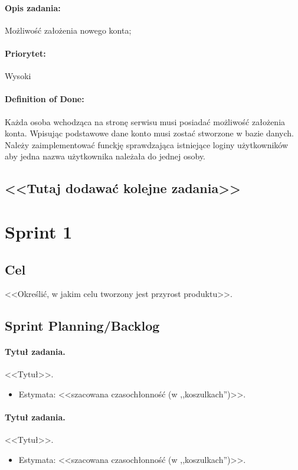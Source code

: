 \documentclass[a4paper]{article}
\begin{document}
	\paragraph{Opis zadania:} Możliwość założenia nowego konta;
	\paragraph{Priorytet:} Wysoki
	\paragraph{Definition of Done:} Każda osoba wchodząca na stronę serwisu musi posiadać możliwość założenia konta. Wpisując podstawowe dane konto musi zostać stworzone w bazie danych. Należy zaimplementować funckję sprawdzająca istniejące loginy użytkowników aby jedna nazwa użytkownika należała do jednej osoby.
	
	\subsection*{<<Tutaj dodawać kolejne zadania>>}
	
	\section{Sprint 1}
	\subsection{Cel} <<Określić, w jakim celu tworzony jest przyrost produktu>>.
	\subsection{Sprint Planning/Backlog}
	
	\paragraph{Tytuł zadania.} <<Tytuł>>.
	\begin{itemize}
		\item Estymata: <<szacowana czasochłonność (w ,,koszulkach'')>>.
	\end{itemize}
	
	\paragraph{Tytuł zadania.} <<Tytuł>>.
	\begin{itemize}
		\item Estymata: <<szacowana czasochłonność (w ,,koszulkach'')>>.
	\end{itemize}
	
\end{document}
